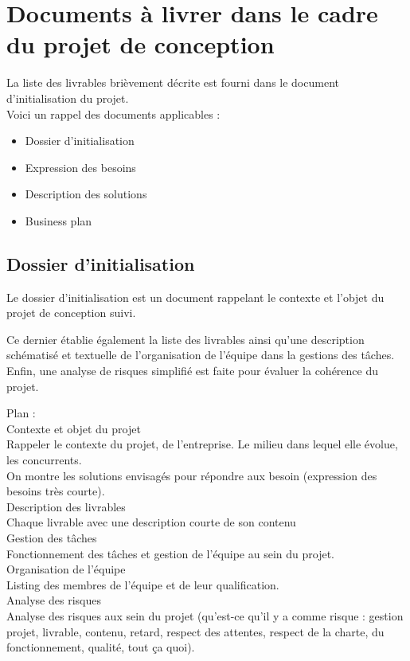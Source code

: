 \documentclass[11pt, a4paper]{article}
\begin{document}
\section{Documents à livrer dans le cadre du projet de conception}
La liste des livrables brièvement décrite est fourni dans le document
d'initialisation du projet. \\

Voici un rappel des documents applicables :
\begin{itemize}
  \item Dossier d'initialisation
  \item Expression des besoins
  \item Description des solutions
  \item Business plan
\end{itemize}

\subsection{Dossier d'initialisation}
Le dossier d'initialisation est un document rappelant le contexte et l'objet du
projet de conception suivi.

Ce dernier établie également la liste des livrables ainsi qu'une description
schématisé et textuelle de l'organisation de l'équipe dans la gestions des
tâches.
Enfin, une analyse de risques simplifié est faite pour évaluer la cohérence du
projet.

Plan :
  \\ Contexte et objet du projet
    \\ Rappeler le contexte du projet, de l'entreprise. Le milieu dans lequel elle
    évolue, les concurrents.
    \\ On montre les solutions envisagés pour répondre aux besoin (expression des
    besoins très courte).
  \\ Description des livrables
    \\ Chaque livrable avec une description courte de son contenu
  \\ Gestion des tâches
    \\ Fonctionnement des tâches et gestion de l'équipe au sein du projet.
  \\ Organisation de l'équipe
    \\ Listing des membres de l'équipe et de leur qualification.
  \\ Analyse des risques
    \\ Analyse des risques aux sein du projet (qu'est-ce qu'il y a comme risque :
    gestion projet, livrable, contenu, retard, respect des attentes, respect de
    la charte, du fonctionnement, qualité, tout ça quoi).
\end{document}
